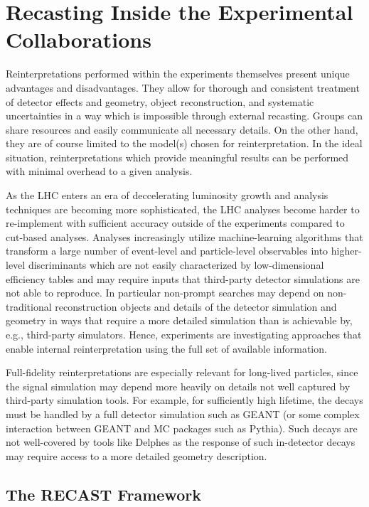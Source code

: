\section{Recasting Inside the Experimental Collaborations}
\label{sec:ch5-recastingInsideExp}

Reinterpretations performed within the experiments themselves present unique advantages and disadvantages. They allow for thorough and consistent treatment of detector effects and geometry, object reconstruction, and systematic uncertainties in a way which is impossible through external recasting. Groups can share resources and easily communicate all necessary details. On the other hand, they are of course limited to the model(s) chosen for reinterpretation. In the ideal situation, reinterpretations which provide meaningful results can be performed with minimal overhead to a given analysis.

As the LHC enters an era of deccelerating luminosity growth and analysis techniques are becoming more sophisticated, the LHC analyses become harder to re-implement with sufficient accuracy outside of the experiments compared to cut-based analyses. Analyses increasingly utilize machine-learning algorithms that transform a large number of event-level and particle-level observables into higher-level discriminants which are not easily characterized by low-dimensional efficiency tables and may require inputs that third-party detector simulations are not able to reproduce. In particular non-prompt searches may depend on non-traditional reconstruction objects and details of the detector simulation and geometry in ways that require a more detailed simulation than is achievable by, e.g., third-party simulators. Hence, experiments are investigating approaches that enable internal reinterpretation using the full set of available information.

Full-fidelity reinterpretations are especially relevant for long-lived particles, since the signal simulation may depend more heavily on details not well captured by third-party simulation tools. For example, for sufficiently high lifetime, the decays must be handled by a full detector simulation such as GEANT (or some complex interaction between GEANT and MC packages such as Pythia). Such decays are not well-covered by tools like Delphes as the response of such in-detector decays may require access to a more detailed geometry description.

\subsection{The RECAST Framework}

